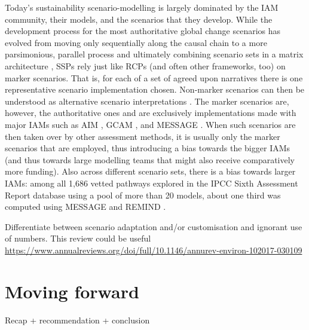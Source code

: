 \documentclass{article}
\begin{document}
\begin{refsection}
Today's sustainability scenario-modelling is largely dominated by the IAM community, their models, and the scenarios that they develop. While the development process for the most authoritative global change scenarios has evolved from moving only sequentially along the causal chain to a more parsimonious, parallel process \parencite{moss_2010} and ultimately combining scenario sets in a matrix architecture \parencite{vanvuuren_2014},\footnotemark{} SSPs rely just like RCPs (and often other frameworks, too) on marker scenarios. That is, for each of a set of agreed upon narratives there is one representative scenario implementation chosen. Non-marker scenarios can then be understood as alternative scenario interpretations \parencite{riahi_2017}. The marker scenarios are, however, the authoritative ones and are exclusively implementations made with major IAMs such as AIM \parencite{fujimori_2017}, GCAM \parencite{calvin_2017}, and MESSAGE \parencite{fricko_20171}. When such scenarios are then taken over by other assessment methods, it is usually only the marker scenarios that are employed, thus introducing a bias towards the bigger IAMs (and thus towards large modelling teams that might also receive comparatively more funding). Also across different scenario sets, there is a bias towards larger IAMs: among all 1,686 vetted pathways explored in the IPCC Sixth Assessment Report database using a pool of more than 20 models, about one third was computed using MESSAGE and REMIND \parencite{gambhir_2022,byers_2022}.

Differentiate between scenario adaptation and/or customisation and ignorant use of numbers. This review could be useful \url{https://www.annualreviews.org/doi/full/10.1146/annurev-environ-102017-030109}

\section{Moving forward}

Recap + recommendation + conclusion


\end{refsection}
\end{document}
